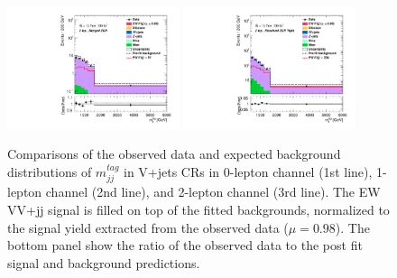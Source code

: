 \begin{figure}[]
     \includegraphics[width=0.45\textwidth]{figures/PostFit/Region_distMTagMerJets_DCRVjet_BMin0_J0_incJet1_L2_T0_incFat1_Y6051_incTag1_Fat1_GlobalFit_unconditionnal_mu1log}
      \includegraphics[width=0.45\textwidth]{figures/PostFit/Region_distMTagResJets_DCRVjetFid_BMin0_T0_Y6051_incTag1_J2_L2_incJet1_GlobalFit_unconditionnal_mu1log}
    \caption{Comparisons of the observed data and expected background distributions of $m^{tag}_{jj}$ in V+jets CRs in 0-lepton channel (1st line), 1-lepton channel (2nd line), and 2-lepton channel (3rd line). The EW VV+jj signal is filled on top of the fitted backgrounds, normalized to the signal yield extracted from the observed data ($\mu = 0.98$). The bottom panel show the ratio of the observed data to the post fit signal and background predictions.}
    \label{fig:postCR}
\end{figure}

